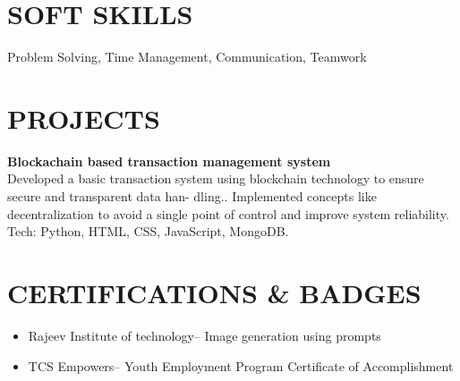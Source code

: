 \documentclass[9.5pt,a4paper]{extarticle}
\begin{document}
\section*{SOFT SKILLS}
\noindent Problem Solving, Time Management, Communication, Teamwork \vspace{4pt}



\section*{PROJECTS}
\noindent \textbf{Blockachain based transaction management system} \\
Developed a basic transaction system using blockchain technology to ensure secure and transparent data han- dling.. Implemented concepts like decentralization to avoid a single point of control and improve system reliability. Tech: Python, HTML, CSS, JavaScript, MongoDB. \vspace{4pt}


\section*{CERTIFICATIONS \& BADGES}
\begin{itemize}[leftmargin=0.2in, itemsep=1pt, topsep=1pt]
    \item Rajeev Institute of technology– Image generation using prompts
    \item TCS Empowers– Youth Employment Program Certificate of Accomplishment
\end{itemize}
\end{document}

